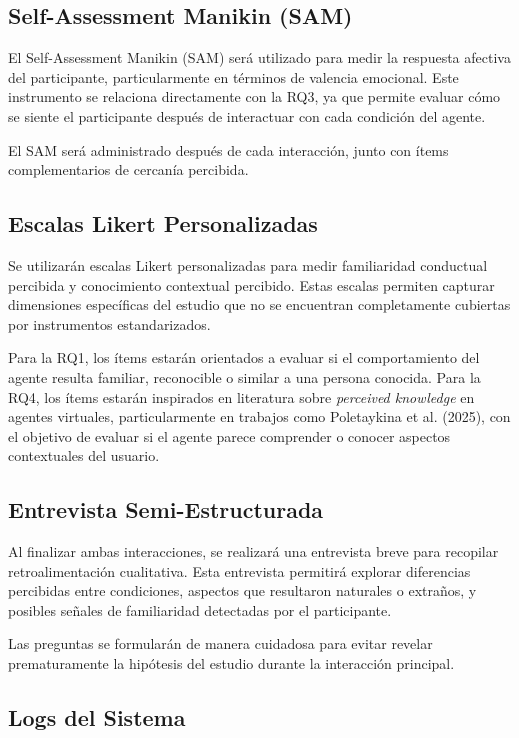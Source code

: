 \documentclass[12pt]{article}
\begin{document}
\subsection{Self-Assessment Manikin (SAM)}

El Self-Assessment Manikin (SAM) será utilizado para medir la respuesta afectiva del participante, particularmente en términos de valencia emocional. Este instrumento se relaciona directamente con la RQ3, ya que permite evaluar cómo se siente el participante después de interactuar con cada condición del agente.

El SAM será administrado después de cada interacción, junto con ítems complementarios de cercanía percibida.

\subsection{Escalas Likert Personalizadas}

Se utilizarán escalas Likert personalizadas para medir familiaridad conductual percibida y conocimiento contextual percibido. Estas escalas permiten capturar dimensiones específicas del estudio que no se encuentran completamente cubiertas por instrumentos estandarizados.

Para la RQ1, los ítems estarán orientados a evaluar si el comportamiento del agente resulta familiar, reconocible o similar a una persona conocida. Para la RQ4, los ítems estarán inspirados en literatura sobre \textit{perceived knowledge} en agentes virtuales, particularmente en trabajos como Poletaykina et al. (2025), con el objetivo de evaluar si el agente parece comprender o conocer aspectos contextuales del usuario.

\subsection{Entrevista Semi-Estructurada}

Al finalizar ambas interacciones, se realizará una entrevista breve para recopilar retroalimentación cualitativa. Esta entrevista permitirá explorar diferencias percibidas entre condiciones, aspectos que resultaron naturales o extraños, y posibles señales de familiaridad detectadas por el participante.

Las preguntas se formularán de manera cuidadosa para evitar revelar prematuramente la hipótesis del estudio durante la interacción principal.

\subsection{Logs del Sistema}
\end{document}
